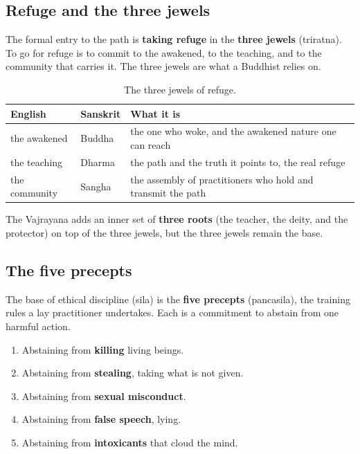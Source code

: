 \subsection{Refuge and the three jewels}

The formal entry to the path is \textbf{taking refuge} in the \textbf{three jewels} (triratna). To go for refuge is to commit to the awakened, to the teaching, and to the community that carries it. The three jewels are what a Buddhist relies on.

\begin{longtable}{l L{2.4cm} L{6.5cm}}
\caption{The three jewels of refuge.}\\
\toprule
\textbf{English} & \textbf{Sanskrit} & \textbf{What it is} \\
\midrule
the awakened & Buddha & the one who woke, and the awakened nature one can reach \\
the teaching & Dharma & the path and the truth it points to, the real refuge \\
the community & Sangha & the assembly of practitioners who hold and transmit the path \\
\bottomrule
\end{longtable}

The Vajrayana adds an inner set of \textbf{three roots} (the teacher, the deity, and the protector) on top of the three jewels, but the three jewels remain the base.

\subsection{The five precepts}

The base of ethical discipline (sila) is the \textbf{five precepts} (pancasila), the training rules a lay practitioner undertakes. Each is a commitment to abstain from one harmful action.

\begin{enumerate}
 \item Abstaining from \textbf{killing} living beings.
 \item Abstaining from \textbf{stealing}, taking what is not given.
 \item Abstaining from \textbf{sexual misconduct}.
 \item Abstaining from \textbf{false speech}, lying.
 \item Abstaining from \textbf{intoxicants} that cloud the mind.
\end{enumerate}

